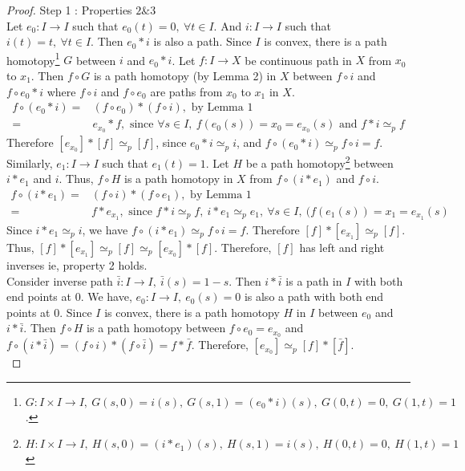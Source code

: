 \begin{proof}
	Step 1 : Properties $2 \& 3$\\

	Let $e_0 : I \to I$ such that $e_0(t) = 0,\ \forall t \in I$. And $i : I \to I$ such that $i(t)=t,\ \forall t \in I$. Then $e_0 \ast{} i$ is also a path. Since $I$ is convex, there is a path homotopy\footnote{$ G : I \times I \to I,\ G(s,0) = i(s),\ G(s,1) = (e_0 \ast{} i)(s),\ G(0,t) = 0,\ G(1,t) = 1$.} $G$ between $i$ and $e_0 \ast{} i$. Let $f : I \to X$ be continuous path in $X$ from $x_0$ to $x_1$. Then $f \circ G$ is a path homotopy (by Lemma 2) in $X$ between $f \circ i$ and $f \circ e_0 \ast{} i$ where $f \circ i$ and $f \circ e_0$ are paths from $x_0$ to $x_1$ in $X$.
\begin{align*}
	f \circ (e_0 \ast i) = & (f \circ e_0)  \ast (f \circ i), \text{ by Lemma 1} \\
	= & e_{x_0} \ast f, \text{ since } \forall s \in I,\ f(e_0(s)) = x_0 = e_{x_0}(s) \text{ and }f \ast{} i \simeq_p f
\end{align*}
	Therefore $[e_{x_0}] \ast [f] \simeq_p [f]$, since $e_0 \ast i \simeq_p i$, and $f \circ (e_0 \ast i) \simeq_p f \circ i = f$. \\
	
	Similarly, $e_1 : I \to I$ such that $e_1(t) = 1$. Let $H$ be a path homotopy\footnote{$H : I \times I \to I,\ H(s,0)=(i \ast e_1)(s),\ H(s,1) = i(s),\ H(0,t) = 0,\ H(1,t) = 1$} between $i \ast e_1$ and $i$. Thus, $f \circ H$ is a path homotopy in $X$ from $f \circ (i \ast e_1)$ and $f \circ i$.
\begin{align*}
	f \circ (i \ast e_1) = & (f \circ i) \ast (f \circ e_1), \text{ by Lemma 1} \\
	= & f \ast e_{x_1}, \text{ since } f \ast i \simeq_p f,\ i \ast e_1 \simeq_p e_1,\ \forall s \in I,\ (f(e_1(s)) = x_1 = e_{x_1}(s) 
\end{align*}
	Since $i \ast e_1 \simeq_p i$, we have $f \circ (i \ast e_1) \simeq_p f \circ i = f$. Therefore $[f] \ast [e_{x_1}] \simeq_p [f]$. Thus, $[f] \ast [e_{x_1}] \simeq_p [f] \simeq_p [e_{x_0}] \ast [f]$. Therefore, $[f]$ has left and right inverses ie, property 2 holds.\\

	Consider inverse path $\bar{i} : I \to I,\ \bar{i}(s) = 1-s$. Then $i \ast \bar{i}$ is a path in $I$ with both end points at $0$. We have, $e_0 : I \to I,\ e_0(s) = 0$ is also a path with both end points at $0$. Since $I$ is convex, there is a path homotopy $H$ in $I$ between $e_0$ and $i \ast \bar{i}$. Then $f \circ H$ is a path homotopy between $f \circ e_0 = e_{x_0}$ and $f \circ (i \ast \bar{i}) = (f \circ i) \ast (f \circ \bar{i}) = f \ast \bar{f}$. Therefore, $[e_{x_0}] \simeq_p [f] \ast [\bar{f}]$.\\


\end{proof}

